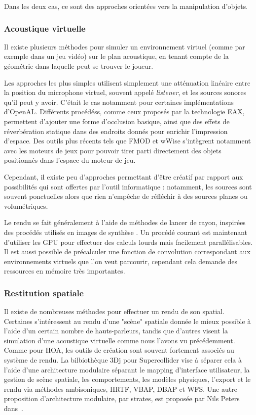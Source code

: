 \documentclass[french,12pt]{article}
\begin{document}
Dans les deux cas, ce sont des approches orientées vers la manipulation d'objets.

\subsubsection{Acoustique virtuelle}
Il existe plusieurs méthodes pour simuler un environnement virtuel (comme par exemple dans un jeu vidéo) sur le plan acoustique, en tenant compte de la géométrie dans laquelle peut se trouver le joueur.

Les approches les plus simples utilisent simplement une atténuation linéaire entre la position du microphone virtuel, souvent appelé \textit{listener}, et les sources sonores qu'il peut y avoir. C'était le cas notamment pour certaines implémentations d'OpenAL\cite{hiebert_openal_2005}. Différents procédéss, comme ceux proposés par la technologie EAX\cite{funkhouser_survey_2003}, permettent d'ajouter une forme d'occlusion basique, ainsi que des effets de réverbération statique dans des endroits donnés pour enrichir l'impression d'espace. Des outils plus récents tels que FMOD et wWise s'intègrent notamment avec les moteurs de jeux pour pouvoir tirer parti directement des objets positionnés dans l'espace du moteur de jeu.

Cependant, il existe peu d'approches permettant d'être créatif par rapport aux possibilités qui sont offertes par l'outil informatique : notamment, les sources sont souvent ponctuelles alors que rien n'empêche de réfléchir à des sources planes ou volumétriques. 

Le rendu se fait généralement à l'aide de méthodes de lancer de rayon, inspirées des procédés utilisés en images de synthèse \cite{funkhouser_beam_1998,tsingos_fast_1998}.
Un procédé courant est maintenant d'utiliser les \ac{GPU} pour effectuer des calculs lourds mais facilement parallélisables\cite{rodriguez_performance_2014,cheng_design_2014,taylor_guided_2012}. Il est aussi possible de précalculer une fonction de convolution correspondant aux environnements virtuels que l'on veut parcourir, cependant cela demande des ressources en mémoire très importantes\cite{raghuvanshi_parametric_2014}.

\subsubsection{Restitution spatiale}
Il existe de nombreuses méthodes pour effectuer un rendu de son spatial. Certaines s'intéressent au rendu d'une "scène" spatiale donnée le mieux possible à l'aide d'un certain nombre de hauts-parleurs, tandis que d'autres visent la simulation d'une acoustique virtuelle comme nous l'avons vu précédemment. Comme pour HOA, les outils de création sont souvent fortement associés au système de rendu. La bilbiothèque 3Dj\cite{perez-lopez_3dj_2015} pour Supercollider vise à séparer cela à l'aide d'une architecture modulaire séparant le mapping d'interface utilisateur, la gestion de scène spatiale, les comportements, les modèles physiques, l'export et le rendu via méthodes ambisoniques, HRTF\cite{noisternig_3d_2003}, \ac{VBAP}, \ac{DBAP} et \ac{WFS}. Une autre proposition d'architecture modulaire, par strates, est proposée par Nils Peters dans~\cite{peters_stratified_2009}.
\end{document}
